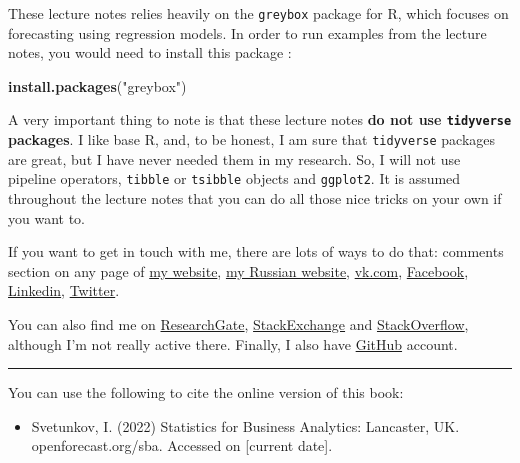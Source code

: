 \documentclass[
]{book}
\newenvironment{Shaded}{\begin{snugshade}}{\end{snugshade}}
\newcommand{\KeywordTok}[1]{\textcolor[rgb]{0.13,0.29,0.53}{\textbf{#1}}}
\newcommand{\NormalTok}[1]{#1}
\newcommand{\StringTok}[1]{\textcolor[rgb]{0.31,0.60,0.02}{#1}}
\providecommand{\tightlist}{%
  \setlength{\itemsep}{0pt}\setlength{\parskip}{0pt}}
\theoremstyle{definition}
\theoremstyle{definition}
\theoremstyle{definition}
\theoremstyle{definition}
\theoremstyle{remark}
\begin{document}
These lecture notes relies heavily on the \texttt{greybox} package for R, which focuses on forecasting using regression models. In order to run examples from the lecture notes, you would need to install this package \citep{R-greybox}:

\begin{Shaded}
\begin{Highlighting}[]
\KeywordTok{install.packages}\NormalTok{(}\StringTok{"greybox"}\NormalTok{)}
\end{Highlighting}
\end{Shaded}

A very important thing to note is that these lecture notes \textbf{do not use \texttt{tidyverse} packages}. I like base R, and, to be honest, I am sure that \texttt{tidyverse} packages are great, but I have never needed them in my research. So, I will not use pipeline operators, \texttt{tibble} or \texttt{tsibble} objects and \texttt{ggplot2}. It is assumed throughout the lecture notes that you can do all those nice tricks on your own if you want to.

If you want to get in touch with me, there are lots of ways to do that: comments section on any page of \href{https://forecasting.svetunkov.ru/}{my website}, \href{https://ivan.svetunkov.ru/}{my Russian website}, \href{https://vk.com/isvetunkov}{vk.com}, \href{https://www.facebook.com/isvetunkov}{Facebook}, \href{https://www.linkedin.com/in/isvetunkov}{Linkedin}, \href{https://twitter.com/iSvetunkov}{Twitter}.

You can also find me on \href{https://www.researchgate.net/profile/Ivan_Svetunkov}{ResearchGate}, \href{http://stats.stackexchange.com/users/87585/ivan-svetunkov}{StackExchange} and \href{http://stackoverflow.com/users/5296618/ivan-svetunkov}{StackOverflow}, although I'm not really active there. Finally, I also have \href{https://github.com/config-i1}{GitHub} account.

\begin{center}\rule{0.5\linewidth}{0.5pt}\end{center}

You can use the following to cite the online version of this book:

\begin{itemize}
\tightlist
\item
  Svetunkov, I. (2022) Statistics for Business Analytics: Lancaster, UK. openforecast.org/sba. Accessed on {[}current date{]}.
\end{itemize}
\end{document}
